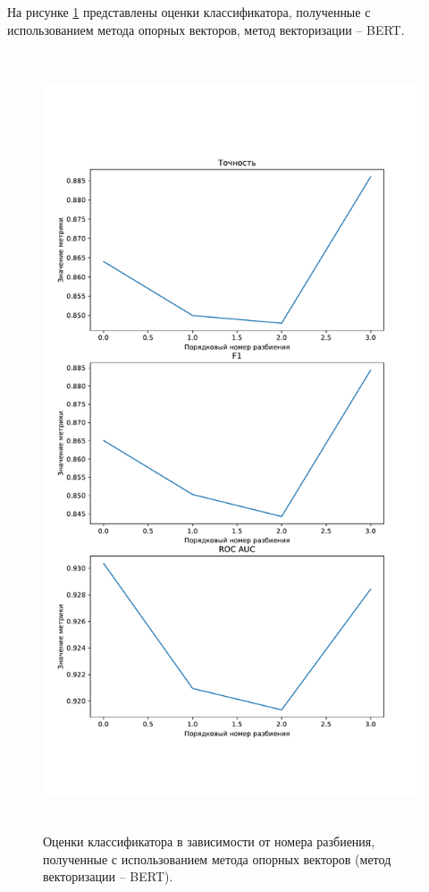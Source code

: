 На рисунке \ref{img:svcMetricsBert} представлены оценки классификатора, полученные с использованием метода опорных векторов, метод векторизации -- BERT.
\begin{figure}[H]
	\centering
	\includegraphics[height=23cm]{inc/plots/svcMetricsBert.pdf}
	\caption{ Оценки классификатора в зависимости от номера разбиения, полученные с использованием метода опорных векторов (метод векторизации -- BERT). }
	\label{img:svcMetricsBert}
\end{figure}



